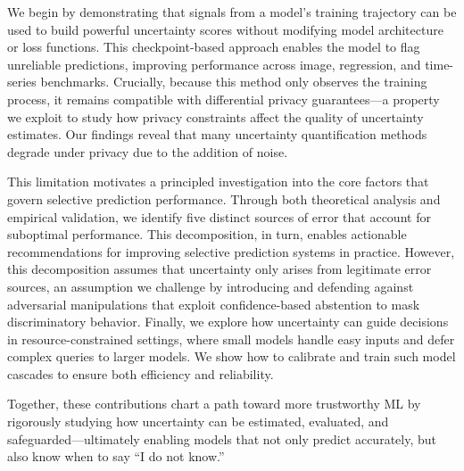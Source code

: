 We begin by demonstrating that signals from a model’s training trajectory can be used to build powerful uncertainty scores without modifying model architecture or loss functions. This checkpoint-based approach enables the model to flag unreliable predictions, improving performance across image, regression, and time-series benchmarks. Crucially, because this method only observes the training process, it remains compatible with differential privacy guarantees—a property we exploit to study how privacy constraints affect the quality of uncertainty estimates. Our findings reveal that many uncertainty quantification methods degrade under privacy due to the addition of noise.


This limitation motivates a principled investigation into the core factors that govern selective prediction performance. Through both theoretical analysis and empirical validation, we identify five distinct sources of error that account for suboptimal performance. This decomposition, in turn, enables actionable recommendations for improving selective prediction systems in practice. However, this decomposition assumes that uncertainty only arises from legitimate error sources, an assumption we challenge by introducing and defending against adversarial manipulations that exploit confidence-based abstention to mask discriminatory behavior. Finally, we explore how uncertainty can guide decisions in resource-constrained settings, where small models handle easy inputs and defer complex queries to larger models. We show how to calibrate and train such model cascades to ensure both efficiency and reliability.

Together, these contributions chart a path toward more trustworthy ML by rigorously studying how uncertainty can be estimated, evaluated, and safeguarded—ultimately enabling models that not only predict accurately, but also know when to say “I do not know.”
